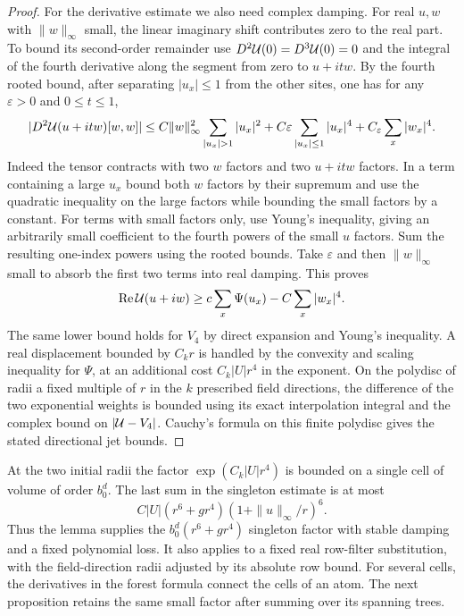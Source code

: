 \documentclass[11pt]{article}
\theoremstyle{definition}
\begin{document}
\begin{proof}
For the derivative estimate we also need complex damping.
For real \(u,w\) with \(\|w\|_\infty\) small, the linear
imaginary shift contributes zero to the real part.
To bound its second-order remainder use
\(D^2{\cal U}(0)=D^3{\cal U}(0)=0\) and the integral
of the fourth derivative along the segment from zero to
\(u+itw\). By the fourth rooted bound, after separating
\(|u_x|\le1\) from the other sites, one has for any
\(\varepsilon>0\) and \(0\le t\le1\),
\begin{equation}
 |D^2{\cal U}(u+itw)[w,w]|
 \le C\|w\|_\infty^2\sum_{|u_x|>1}|u_x|^2
       +C\varepsilon\sum_{|u_x|\le1}|u_x|^4
       +C_\varepsilon\sum_x|w_x|^4.
\end{equation}
Indeed the tensor contracts with two \(w\) factors and two
\(u+itw\) factors. In a term containing a large \(u_x\)
bound both \(w\) factors by their supremum and use the
quadratic inequality on the large factors while bounding
the small factors by a constant. For terms with small
factors only, use Young's inequality, giving an arbitrarily
small coefficient to the fourth powers of the small \(u\)
factors. Sum the resulting one-index powers using the
rooted bounds. Take \(\varepsilon\) and then
\(\|w\|_\infty\) small to absorb the first two terms into
real damping. This proves
\begin{equation}
 \operatorname{Re}{\cal U}(u+iw)\ge
                   c\sum_x\Psi(u_x)-C\sum_x|w_x|^4 .
\end{equation}
The same lower bound holds for \(V_4\) by direct expansion
and Young's inequality. A real displacement bounded by
\(C_k r\) is handled by the convexity and scaling inequality
for \(\Psi\), at an additional cost \(C_k |U|r^4\) in the exponent.
On the polydisc of radii a fixed multiple of \(r\) in the
\(k\) prescribed field directions, the difference of the
two exponential weights is bounded using its exact
interpolation integral and the complex bound on
\(|{\cal U}-V_4|\). Cauchy's formula on this finite polydisc
gives the stated directional jet bounds.
\end{proof}

At the two initial radii the factor \(\exp(C_k|U|r^4)\)
is bounded on a single cell of volume of order \(b_0^d\).
The last sum in the singleton estimate is at most
\begin{equation}
 C|U|(r^6+g r^4)(1+\|u\|_\infty/r)^6 .
\end{equation}
Thus the lemma supplies the \(b_0^d(r^6+g r^4)\) singleton
factor with stable damping and a fixed polynomial loss.
It also applies to a fixed real row-filter substitution,
with the field-direction radii adjusted by its absolute
row bound. For several cells, the derivatives in the forest formula
connect the cells of an atom. The next proposition retains the same
small factor after summing over its spanning trees.
\end{document}
